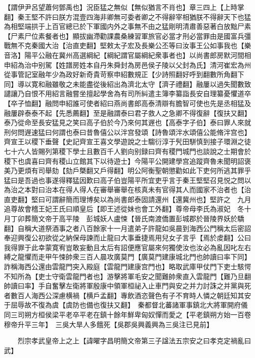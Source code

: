 【謂伊尹呂望蕭何鄧禹也】況臣猛之無似【無似猶言不肖也】章三四上【上時掌翻】秦王堅不許曰朕方混壹四海非卿無可委者卿之不得辭宰相猶朕不得辭天下也猛為相堅端拱于上百官總已於下軍國内外之事無不由之猛剛明清肅善惡著白放黜尸素【尸素尸位素餐者也】顯拔幽滯勸課農桑練習軍旅官必當才刑必當罪由是國富兵彊戰無不克秦國大治【治直吏翻】堅敕太子宏及長樂公丕等曰汝事王公如事我也【樂音洛】陽平公融在冀州高選綱紀【綱紀謂官屬綱紀衆事者也】以尚書郎房默河間相申紹為治中别駕【姓譜房姓本自丹朱舜封為房邑侯子陵以父封為氏】清河崔宏為州從事管記室融年少為政好新奇貴苛察申紹數規正【少詩照翻好呼到翻數所角翻下同】導以寛和融雖敬之未能盡從後紹出為濟北太守【濟子禮翻】融屢以過失聞數致譴讓乃自恨不用紹言融嘗坐擅起學舍為有司所糾遣主簿李纂詣長安自理纂憂懼道卒【卒子恤翻】融問申紹誰可使者紹曰燕尚書郎高泰清辯有膽智可使也先是丞相猛及融屢辟泰泰不起【先悉薦翻】至是融謂泰曰君子救人之急卿不得復辭【復扶又翻】泰乃從命至長安猛見之笑曰高子伯於今乃來何其遟也【高泰字子伯】泰曰罪人來就刑何問遟速猛曰何謂也泰曰昔魯僖公以泮宫發頌【詩魯頌泮水頌僖公能脩泮宫也】齊宣王以稷下垂聲【史記齊宣王喜文學遊說之士騶衍淳于髠田駢慎到接子環淵之徒七十六人皆賜列第稷下學士且數百千人劉向别録曰齊有稷門城門也談說之士期會於稷下也虞喜曰齊有稷山立館其下以待遊士】今陽平公開建學宫追蹤齊魯未聞明詔褒美乃更煩有司舉劾【劾戶槩翻又戶得翻】明公阿衡聖朝懲勸如此下吏何所逃其罪乎猛曰是吾過也事遂得釋猛因歎曰高子伯豈陽平所宜吏乎言于秦王堅堅召見悦之問以為治之本對曰治本在得人得人在審舉審舉在核真未有官得其人而國家不治者也【治直吏翻】堅曰可謂辭簡而理博矣以為尚書郎泰固請還州【還冀州也】堅許之　九月追尊故會稽王妃王氏曰順皇后【即王述從妹也會工外翻】尊帝母李氏為淑妃　冬十月丁卯葬簡文帝于高平陵　彭城妖人盧悚【晉氏南渡僑置彭城郡於晉陵界妖於驕翻】自稱大道祭酒事之者八百餘家十一月遣弟子許龍如吳晨到海西公門稱太后密詔奉迎興復公初欲從之納保母諫而止龍曰大事垂捷焉用兒女子言乎【焉於䖍翻】公曰我得罪于此幸蒙寛宥豈敢妄動且太后有詔便應官屬來何獨使汝也汝必為亂因叱左右縛之龍懼而走甲午悚帥衆三百人晨攻廣莫門【廣莫門建康城北門也帥讀曰率下同】詐稱海西公還由雲龍門突入殿庭【雲龍門建康宫門也】略取武庫甲仗門下吏士駭愕不知所為【吏士守衛雲龍門者也】游擊將軍毛安之聞難帥衆直入雲龍門【難乃旦翻帥讀曰率】手自奮擊左衛將軍殷康中領軍桓祕入止車門與安之并力討誅之并黨與死者數百人海西公深慮横禍【横戶孟翻】專飲酒恣聲色有子不育時人憐之朝廷知其安于屈辱故不復為虞【虞防也備也復扶又翻】　秦都督北蕃諸軍事鎮北大將軍開府儀同三司朔方桓侯梁平老卒平老在鎮十餘年鮮卑匈奴憚而愛之【平老鎮朔方始一百卷穆帝升平三年】　三吳大旱人多餓死【吳郡吳興義興為三吳注已見前】

　　烈宗孝武皇帝上之上【諱曜字昌明簡文帝第三子諡法五宗安之曰孝克定禍亂曰武】


